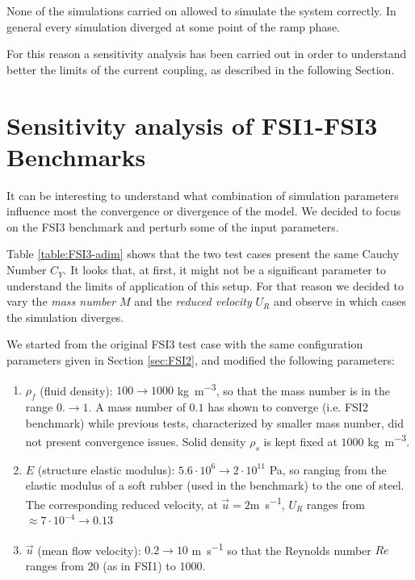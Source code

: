 None of the simulations carried on allowed to simulate the system correctly. In general every simulation diverged at some point of the ramp phase.

For this reason a sensitivity analysis has been carried out in order to understand better the limits of the current coupling, as described in the following Section.


\section{Sensitivity analysis of FSI1-FSI3 Benchmarks}
\label{sec:FSI3-sensitivity}

It can be interesting to understand what combination of simulation parameters influence most the convergence or divergence of the model. We decided to focus on the FSI3 benchmark and perturb some of the input parameters.

Table \ref{table:FSI3-adim} shows that the two test cases present the same Cauchy Number $C_Y$. It looks that, at first, it might not be a significant parameter to understand the limits of application of this setup. For that reason we decided to vary the \textit{mass number} $M$ and the \textit{reduced velocity} $U_R$ and observe in which cases the simulation diverges.

We started from the original FSI3 test case with the same configuration parameters given in Section \ref{sec:FSI2}, and modified the following parameters:

\begin{enumerate}
    \item $\rho_f$ (fluid density): $100\rightarrow1000$ \si{kg.m^{-3}}, so that the mass number is in the range $0.\rightarrow1$. A mass number of $0.1$ has shown to converge (i.e. FSI2 benchmark) while previous tests, characterized by smaller mass number, did not present convergence issues. Solid density $\rho_s$ is kept fixed at $1000$ \si{kg.m^{-3}}. 
    \item $E$ (structure elastic modulus): $5.6\cdot10^{6}\rightarrow2\cdot10^{11}$ \si{Pa}, so ranging from the elastic modulus of a soft rubber (used in the benchmark) to the one of steel. The corresponding reduced velocity, at $\vec{u}=2$\si{m.s^{-1}}, $U_R$ ranges from $\approx7\cdot10^{-4}\rightarrow0.13 $
    \item $\vec{u}$ (mean flow velocity): $0.2\rightarrow10$ \si{m.s^{-1}} so that the Reynolds number $Re$ ranges from 20 (as in FSI1) to 1000. 
\end{enumerate}

